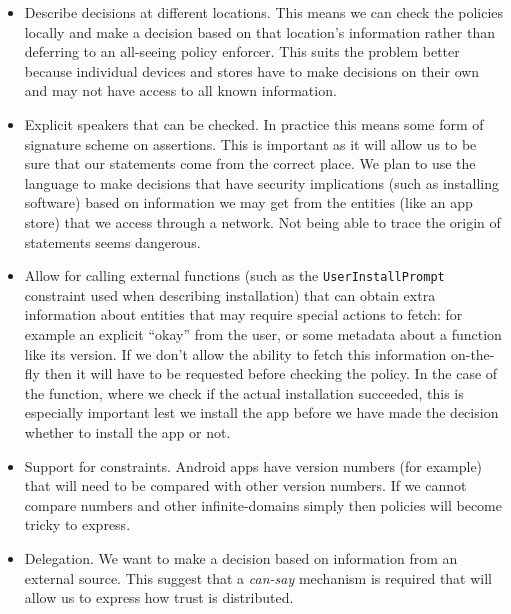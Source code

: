 \documentclass[a4paper]{article}
\begin{document}
\begin{itemize}

  \item Describe decisions at different locations.  This means we can check the
    policies locally and make a decision based on that location's information
    rather than deferring to an all-seeing policy enforcer.  This suits the
    problem better because individual devices and stores have to make decisions
    on their own and may not have access to all known information.

  \item Explicit speakers that can be checked. In practice this means some form
    of signature scheme on assertions.  This is important as it will allow us to
    be sure that our statements come from the correct place.  We plan to use the
    language to make decisions that have security implications (such as
    installing software) based on information we may get from the entities (like
    an app store) that we access through a network.  Not being able to trace the
    origin of statements seems dangerous.

  \item Allow for calling external functions (such as the
    \texttt{UserInstallPrompt} constraint used when describing installation)
    that can obtain extra information about entities that may require special
    actions to fetch: for example an explicit ``okay'' from the user, or some
    metadata about a function like its version.  If we don't allow the ability
    to fetch this information on-the-fly then it will have to be requested
    before checking the policy.  In the case of the  function,
    where we check if the actual installation succeeded, this is especially
    important lest we install the app before we have made the decision whether
    to install the app or not.

  \item Support for constraints.  Android apps have version numbers (for
    example) that will need to be compared with other version numbers.  If we
    cannot compare numbers and other infinite-domains simply then policies will
    become tricky to express.

  \item Delegation.  We want to make a decision based on information from an
    external source.  This suggest that a \emph{can-say} mechanism is required
    that will allow us to express how trust is distributed.

\end{itemize}
    
\end{document}

